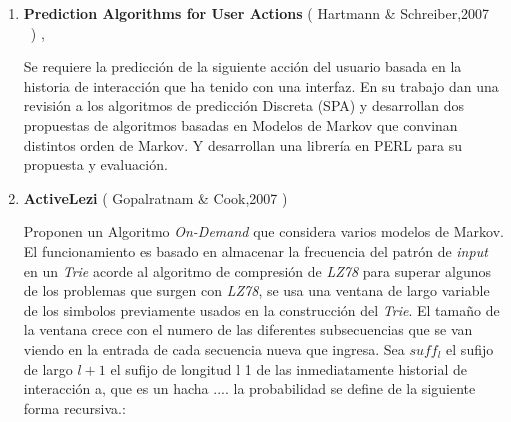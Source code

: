 \begin{enumerate}



  \item \textbf{Prediction Algorithms for User Actions} ( Hartmann \& Schreiber,2007  \etal~\cite{hartmann2007}) , 

Se requiere la predicción de la siguiente acción del usuario basada en la historia de interacción que ha tenido con una interfaz. 
En su trabajo dan una revisión a los algoritmos de predicción Discreta (SPA) y desarrollan dos propuestas de algoritmos basadas en Modelos de Markov que convinan distintos orden de Markov. Y desarrollan una librería en PERL para su propuesta y evaluación.









  \item \textbf{ActiveLezi} ( Gopalratnam \& Cook,2007 \etal\cite{Gopalratnam2007}) 
  
  Proponen un Algoritmo \emph{On-Demand} que considera varios modelos de Markov.  
  El funcionamiento es basado en almacenar la frecuencia del patrón de \emph{input} en un \emph{Trie} acorde al algoritmo de compresión de \emph{LZ78} para superar algunos de los problemas que surgen con \emph{LZ78}, se usa una ventana de largo variable de los simbolos previamente usados en la construcción del \emph{Trie}. El tamaño de la ventana crece con el numero de las diferentes subsecuencias que se van viendo en la entrada de cada secuencia nueva que ingresa.  Sea $suff_{l}$  el sufijo de largo $l+1$ el sufijo de longitud l 1 de las inmediatamente historial de interacción a, que es un hacha .... la probabilidad se define de la siguiente forma recursiva.:






\end{enumerate}
